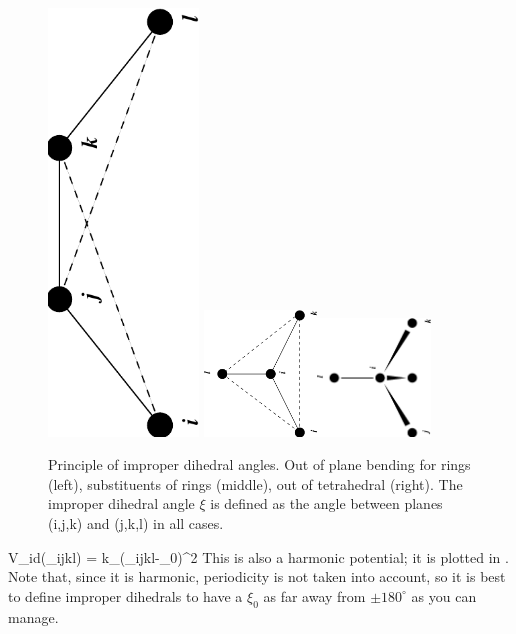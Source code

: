 \begin {figure}
\centerline{\includegraphics[angle=270,width=4cm]{plots/ring-imp}\hspace{1cm}
\includegraphics[angle=270,width=3cm]{plots/subst-im}\hspace{1cm}\includegraphics[angle=270,width=3cm]{plots/tetra-im}}
\caption[Improper dihedral angles.]{Principle of improper
dihedral angles. Out of plane bending for rings (left), substituents
of rings (middle), out of tetrahedral (right). The improper dihedral
angle $\xi$ is defined as the angle between planes (i,j,k) and (j,k,l)
in all cases.}
\label{fig:imp}
\end {figure}

\beq
V_{id}(\xi_{ijkl}) = k_{\xi}(\xi_{ijkl}-\xi_0)^2
\eeq
This is also a harmonic potential; it is plotted in
. Note that, since it is harmonic, periodicity is
not taken into account, so it is best to define improper dihedrals
to have a $\xi_0$ as far away from $\pm 180^\circ$ as you can manage.

